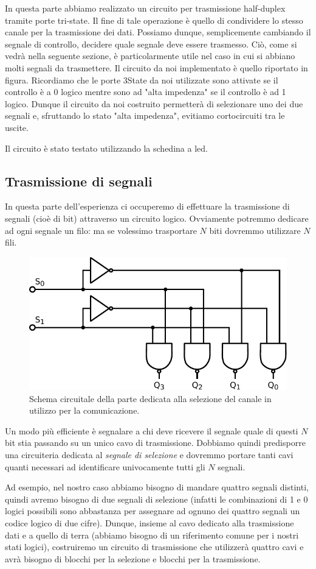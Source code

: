 In questa parte abbiamo realizzato un circuito per trasmissione half-duplex tramite porte tri-state.
Il fine di tale operazione è quello di condividere lo stesso canale per la trasmissione dei dati.
Possiamo dunque, semplicemente cambiando il segnale di controllo, decidere quale segnale deve essere trasmesso.
Ciò, come si vedrà nella seguente sezione, è particolarmente utile nel caso in cui si abbiano molti segnali da trasmettere.
Il circuito da noi implementato è quello riportato in figura.
Ricordiamo che le porte 3State da noi utilizzate sono attivate se il controllo è a 0 logico mentre sono ad "alta impedenza" se il controllo è ad 1 logico.
Dunque il circuito da noi costruito permetterà di selezionare uno dei due segnali e, sfruttando lo stato "alta impedenza", evitiamo cortocircuiti tra le uscite.

Il circuito è stato testato utilizzando la schedina a led.

\subsection{Trasmissione di segnali}

In questa parte dell'esperienza ci occuperemo di effettuare la trasmissione di segnali (cioè di bit) attraverso un circuito logico.
Ovviamente potremmo dedicare ad ogni segnale un filo: ma se volessimo trasportare $N$ biti dovremmo utilizzare $N$ fili.

\begin{figure}
\centering
\includegraphics[width=.38\textwidth]{../E10/latex/selector.pdf}
\caption{Schema circuitale della parte dedicata alla selezione del canale in utilizzo per la comunicazione.}
\label{cir10:selector}
\end{figure}

Un modo più efficiente è segnalare a chi deve ricevere il segnale quale di questi $N$ bit stia passando su un unico cavo di trasmissione.
Dobbiamo quindi predisporre una circuiteria dedicata al \textit{segnale di selezione} e dovremmo portare tanti cavi quanti necessari ad identificare univocamente tutti gli $N$ segnali.

Ad esempio, nel nostro caso abbiamo bisogno di mandare quattro segnali distinti, quindi avremo bisogno di due segnali di selezione (infatti le combinazioni di 1 e 0 logici possibili sono abbastanza per assegnare ad ognuno dei quattro segnali un codice logico di due cifre).
Dunque, insieme al cavo dedicato alla trasmissione dati e a quello di terra (abbiamo bisogno di un riferimento comune per i nostri stati logici), costruiremo un circuito di trasmissione che utilizzerà quattro cavi e avrà bisogno di blocchi per la selezione e blocchi per la trasmissione.

